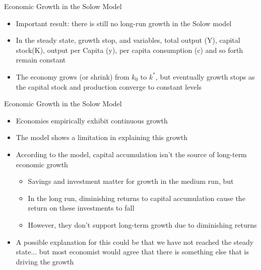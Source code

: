 \documentclass[aspectratio=1610]{beamer}
\begin{document}
\begin{frame}[wide]{Economic Growth in the Solow Model}
	\begin{itemize}
		\item Important result:	there is still no long-run growth in the Solow model
		\item In the steady state, growth stop, and variables, total output (Y), capital stock(K), output per Capita (y), per capita consumption (c) and so forth remain constant
		\item The economy grows (or shrink) from $k_0$ to $k^*$, but eventually growth stops as the capital stock and production converge to constant levels
	\end{itemize}
\end{frame}

\begin{frame}[wide]{Economic Growth in the Solow Model}
	\begin{itemize}
		\item Economies empirically exhibit continuous growth
		\item The model shows a limitation in explaining this growth
		\item According to the model, capital accumulation isn't the source of long-term economic growth
		\begin{itemize}
			\item Savings and investment matter for growth in the medium run, but 
			\item In the long run, diminishing returns to capital accumulation cause the return on these investments to fall
			\item However, they don't support long-term growth due to diminishing returns
		\end{itemize}
		\item A possible explanation for this could be that we have not reached the steady state... but most economist would agree that there is something else that is driving the growth
		
	\end{itemize}
\end{frame}

\end{document}
